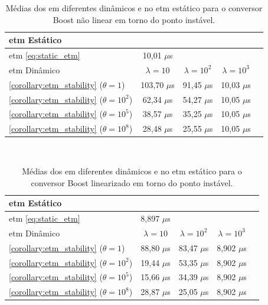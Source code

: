 \begin{table}[H]
  \centering
  \setlength{\tabcolsep}{10pt}
  \captionsetup{justification=centering}
  \begin{tabular}{lcccc}
    \toprule
      \acrshort{etm} Estático \\
    \midrule
      \acrshort{etm} \eqref{eq:static_etm} & 10,01 $\mu$s \\
    \bottomrule
    \toprule
    \acrshort{etm} Dinâmico & $\lambda = 10$ & $\lambda = 10^2$ & $\lambda = 10^3$ \\
    \midrule
      \autoref{corollary:etm_stability} ($\theta = 1$) & 103,70 $\mu$s & 91,45 $\mu$s &  10,03 $\mu$s   \\
      \autoref{corollary:etm_stability} ($\theta = 10^2$) & 62,34 $\mu$s & 54,27 $\mu$s & 10,05 $\mu$s\\
      \autoref{corollary:etm_stability} ($\theta = 10^5$) & 38,57 $\mu$s & 35,25 $\mu$s & 10,05 $\mu$s\\
      \autoref{corollary:etm_stability} ($\theta = 10^8$) & 28,48 $\mu$s & 25,55 $\mu$s & 10,05 $\mu$s\\
    \bottomrule
  \end{tabular} \\[4pt]
  \caption{Médias dos  em diferentes  dinâmicos e no \acrshort{etm} estático \newline para o conversor Boost não linear em torno do ponto instável.}
  \label{table:dynamic_etm_approaches_boost_sl}
\end{table}

\begin{table}[H]
  \centering
  \setlength{\tabcolsep}{10pt}
  \captionsetup{justification=centering}
  \begin{tabular}{lcccc}
    \toprule
      \acrshort{etm} Estático \\
    \midrule
      \acrshort{etm} \eqref{eq:static_etm} & 8,897 $\mu$s \\
    \bottomrule
    \toprule
      \acrshort{etm} Dinâmico & $\lambda = 10$ & $\lambda = 10^2$ & $\lambda = 10^3$ \\
    \midrule
      \autoref{corollary:etm_stability} ($\theta = 1$) & 88,80 $\mu$s & 83,47 $\mu$s & 8,902 $\mu$s \\
      \autoref{corollary:etm_stability} ($\theta = 10^2$) & 19,44 $\mu$s & 53,35 $\mu$s & 8,902   $\mu$s\\
      \autoref{corollary:etm_stability} ($\theta = 10^5$) & 15,66 $\mu$s & 34,39 $\mu$s &  8,902 $\mu$s\\
      \autoref{corollary:etm_stability} ($\theta = 10^8$) & 28,87 $\mu$s & 25,05 $\mu$s & 8,902  $\mu$s\\
    \bottomrule
  \end{tabular} \\[4pt]
  \caption{Médias dos  em diferentes  dinâmicos e no \acrshort{etm} estático \newline para o conversor Boost linearizado em torno do ponto instável.}
  \label{table:dynamic_etm_approaches_boost_snl}
\end{table}

